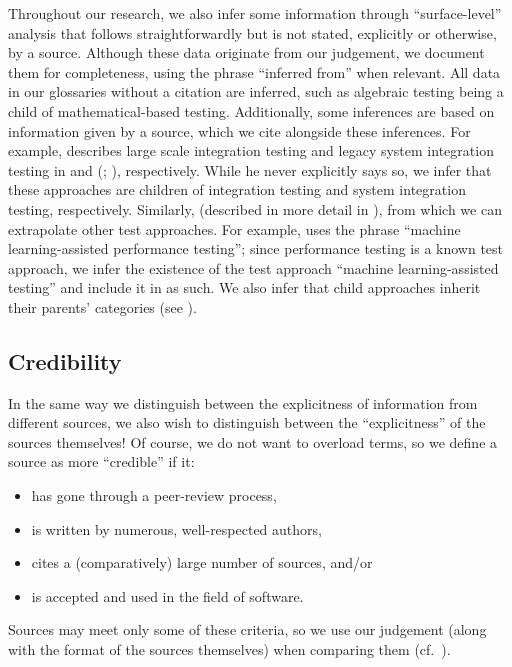 \ifnotpaper
    \label{infers}
    Throughout our research, we also infer some information through
    ``surface-level'' analysis that follows straightforwardly but is not stated,
    explicitly or otherwise, by a source. Although these data originate from
    our judgement, we document them for completeness, using the phrase
    ``inferred from'' when relevant. All data in our glossaries without a
    citation are inferred, such as algebraic testing
    \citep[Fig.~12.2]{PetersAndPedrycz2000} being a child of mathematical-based
    testing. Additionally, some inferences are based on information given by a
    source, which we cite alongside these inferences. For example,
    \citeauthor{Gerrard2000a} describes large scale integration testing and
    legacy system integration testing in \citeyearpar[p.~30]{Gerrard2000b} and
    (\citeyear[Tab.~2]{Gerrard2000a}; \citeyear[Tab.~1]{Gerrard2000b}),
    respectively. While he never explicitly says so, we infer that these
    approaches are children of integration testing and system integration
    testing, respectively. Similarly, \orthTestIntro* (described in
    more detail in ), from which we can extrapolate other test
    approaches. For example, \citet{Moghadam2019} uses the phrase ``machine
    learning-assisted performance testing''; since performance testing is a
    known test approach, we infer the existence of the test approach ``machine
    learning-assisted testing'' and include it in \ourApproachGlossary{} as
    such. We also infer that child approaches inherit their parents' categories
    (see ).
\fi

\subsection{Credibility}\label{cred}

In the same way we distinguish between the explicitness of information from
different sources, we also wish to distinguish between the ``explicitness'' of the
sources themselves! Of course, we do not want to overload terms, so we define a
source as more ``credible'' if it:
\begin{itemize}
    \item has gone through a peer-review process,
    \item is written by numerous, well-respected authors,
    \item cites a (comparatively) large number of sources, and/or
    \item is accepted and used in the field of software.
\end{itemize}
Sources may meet only some of these criteria, so we use our judgement (along
with the format of the sources themselves) when comparing them
(cf.~).
